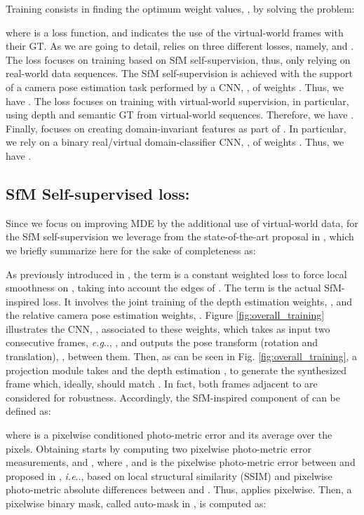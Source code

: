 \documentclass[journal]{IEEEtran}
\makeatletter
\DeclareRobustCommand\onedot{\futurelet\@let@token\@onedot}
\def\@onedot{\ifx\@let@token.\else.\null\fi\xspace}
\def\eg{\emph{e.g}\onedot} \def\Eg{\emph{E.g}\onedot}
\def\ie{\emph{i.e}\onedot} \def\Ie{\emph{I.e}\onedot}
\newcommand{\Fig}[1]{Fig. \ref{fig:#1}}
\makeatother
\begin{document}
Training  consists in finding the optimum weight values, , by solving the problem:

\noindent where  is a loss function, and  indicates the use of the virtual-world frames with their GT. As we are going to detail,  relies on three different losses, namely,  and . The loss  focuses on training  based on SfM self-supervision, thus, only relying on real-world data sequences. The SfM self-supervision is achieved with the support of a camera pose estimation task performed by a CNN, , of weights . Thus, we have . The loss  focuses on training  with virtual-world supervision, in particular, using depth and semantic GT from virtual-world sequences. Therefore, we have . Finally,  focuses on creating domain-invariant features  as part of . In particular, we rely on a binary real/virtual domain-classifier CNN, , of weights . Thus, we have .


\subsection{SfM Self-supervised loss: }
\label{ssec:slfloss}
Since we focus on improving MDE by the additional use of virtual-world data, for the SfM self-supervision we leverage from the state-of-the-art proposal in \cite{Godard:2019MonoDepth2}, which we briefly summarize here for the sake of completeness as:

As previously introduced in \cite{Godard:2017}, the term  is a constant weighted loss to force local smoothness on , taking into account the edges of . The term  is the actual SfM-inspired loss. It involves the joint training of the depth estimation weights, , and the relative camera pose estimation weights, . Figure \ref{fig:overall_training} illustrates the CNN, , associated to these weights, which takes as input two consecutive frames, {\eg}, , and outputs the pose transform (rotation and translation), , between them. Then, as can be seen in \Fig{overall_training}, a projection module takes  and the depth estimation , to generate the synthesized frame  which, ideally, should match . In fact, both frames adjacent to  are considered for robustness. Accordingly, the SfM-inspired component of  can be defined as:

where  is a pixelwise conditioned photo-metric error and  its average over the pixels. Obtaining  starts by computing two pixelwise photo-metric error measurements,  and , where , and  is the pixelwise photo-metric error between  and  proposed in \cite{Godard:2017}, {\ie}, based on local structural similarity (SSIM) and pixelwise photo-metric absolute differences between  and . Thus,  applies pixelwise. Then, a pixelwise binary mask, called auto-mask in \cite{Godard:2019MonoDepth2}, is computed as:
\end{document}
